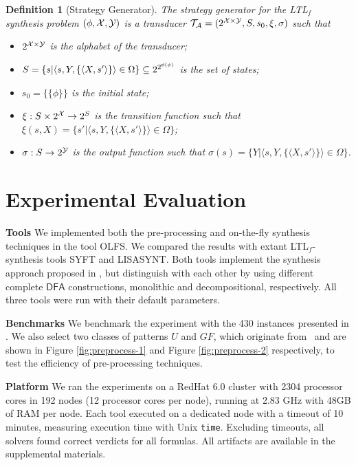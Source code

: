 \documentclass[letterpaper]{article} %
\newcommand{\ltlf}{\textsf{LTL}$_f$\xspace}
\newtheorem{definition}{Definition}
\def\dfa{$\mathsf{DFA}$\xspace}
\newcommand{\cl}{{\sf cl}\xspace}
\newcommand{\syft}{{\sf SYFT}\xspace}
\newcommand{\lisasyft}{{\sf LISASYNT}\xspace}
\newcommand{\toolname}{{\sf OLFS}\xspace}
\begin{document}
\begin{definition}[Strategy Generator]\label{def:transducer}
	The strategy generator for the \ltlf synthesis problem $(\phi, \mathcal{X}, \mathcal{Y})$ is a transducer $\mathcal{T}_{\mathcal{A}}=(2^{\mathcal{X}\times\mathcal{Y}}, S, s_0, \xi, \sigma)$ such that
	\begin{itemize}
		\item $2^{\mathcal{X}\times\mathcal{Y}}$ is the alphabet of the transducer;
		\item $S = \{s| \langle s, Y, \{\langle X, s'\rangle\}\rangle \in\Omega\}\subseteq 2^{2^{\cl(\phi)}}$ is the set of states;
		\item $s_0 = \{\{\phi\}\}$ is the initial state;
		\item $\xi: S\times 2^{\mathcal{X}}\rightarrow 2^S$ is the transition function such that $\xi (s, X) = \{s' | \langle s, Y, \{\langle X, s'\rangle\}\rangle\in \Omega\}$;
		\item $\sigma: S\rightarrow 2^{\mathcal{Y}}$ is the output function such that $\sigma(s)=\{Y | \langle s, Y, \{\langle X, s'\rangle\}\rangle \in \Omega\}$.
	\end{itemize}
\end{definition}







%
\section {Experimental Evaluation}\label {sec:exp}

\noindent\textbf{Tools} We implemented both the pre-processing and on-the-fly synthesis techniques in the tool \toolname. We compared the results with extant \ltlf-synthesis tools \syft \cite{ZTLPV17} and \lisasyft \cite{BLTV20}. Both tools implement the synthesis approach proposed in \cite{GV15}, but distinguish with each other by using different complete \dfa constructions, monolithic and decompositional, respectively. All three tools were run with their default parameters. 

\noindent\textbf{Benchmarks}  We benchmark the experiment with the 430 instances presented in \cite{BLTV20}. We also select two classes of patterns $U$ and $GF$, which originate from~\cite{RV07} and are shown in Figure \ref{fig:preprocess-1} and Figure \ref{fig:preprocess-2} respectively, to test the efficiency of pre-processing techniques.

\noindent\textbf{Platform} We ran the experiments on a RedHat 6.0 cluster with 2304 processor cores
in 192 nodes (12 processor cores per node), running at 2.83 GHz with 48GB of
RAM per node. 
Each tool executed on a dedicated node with a timeout of 10 minutes, measuring execution time with Unix \texttt{time}. Excluding timeouts, all solvers found correct verdicts for all formulas. All artifacts are available in the supplemental materials.
\end{document}
